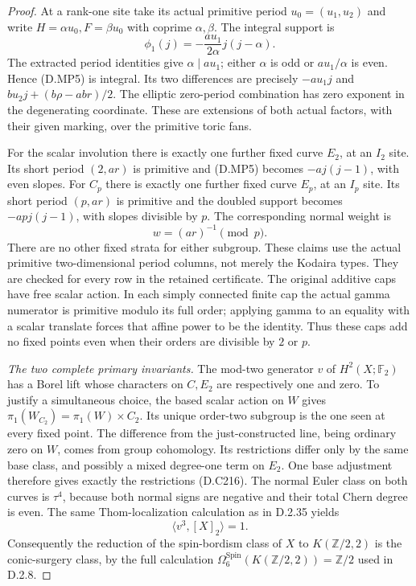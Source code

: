 \begin{proof}
At a rank-one site take its actual primitive period $u_0=(u_1,u_2)$
and write $H=\alpha u_0,F=\beta u_0$ with coprime
$\alpha,\beta$. The integral support is
\[
       \phi_1(j)=-\frac{a u_1}{2\alpha}j(j-\alpha).
                                                        \tag{D.MP5}
\]
The extracted period identities give $\alpha\mid a u_1$;
either $\alpha$ is odd or $a u_1/\alpha$ is even. Hence (D.MP5)
is integral. Its two differences are precisely
$-a u_1j$ and $b u_2j+(b\rho-ab r)/2$. The elliptic
zero-period combination has zero exponent in the degenerating
coordinate. These are extensions of both actual factors, with
their given marking, over the primitive toric fans.

For the scalar involution there is exactly one further fixed
curve $E_2$, at an $I_2$ site. Its short period $(2,ar)$ is
primitive and (D.MP5) becomes $-a j(j-1)$, with even slopes.
For $C_p$ there is exactly one further fixed curve $E_p$,
at an $I_p$ site. Its short period $(p,ar)$ is primitive and
the doubled support becomes $-ap j(j-1)$, with slopes
divisible by $p$. The corresponding normal weight is
\[
                         w=(ar)^{-1}\pmod p.             \tag{D.MP6}
\]
There are no other fixed strata for either subgroup. These
claims use the actual primitive two-dimensional period columns,
not merely the Kodaira types. They are checked for every row
in the retained certificate. The original additive caps have
free scalar action. In each simply connected finite cap the
actual gamma numerator is primitive modulo its full order;
applying gamma to an equality with a scalar translate forces
that affine power to be the identity. Thus these caps add no
fixed points even when their orders are divisible by $2$ or $p$.

\emph{The two complete primary invariants.}
The mod-two generator $v$ of $H^2(X;\mathbb F_2)$ has a Borel
lift whose characters on $C,E_2$ are respectively one and zero.
To justify a simultaneous choice, the based scalar action on
$W$ gives $\pi_1(W_{C_2})=\pi_1(W)\times C_2$. Its unique
order-two subgroup is the one seen at every fixed point.
The difference from the just-constructed line, being ordinary
zero on $W$, comes from group cohomology. Its restrictions
differ only by the same base class, and possibly a mixed
degree-one term on $E_2$. One base adjustment therefore gives
exactly the restrictions (D.C216). The normal Euler class on
both curves is $\tau^4$, because both normal signs are negative
and their total Chern degree is even. The same Thom-localization
calculation as in D.2.35 yields
\[
                         \langle v^3,[X]_2\rangle=1.     \tag{D.MP7}
\]
Consequently the reduction of the spin-bordism class of $X$
to $K(\mathbb Z/2,2)$ is the conic-surgery class, by the full
calculation $\Omega^{\mathrm{Spin}}_6(K(\mathbb Z/2,2))
=\mathbb Z/2$ used in D.2.8.


\end{proof}
